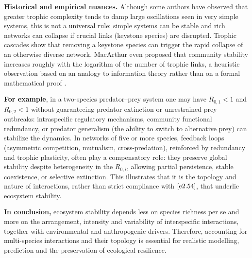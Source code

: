 \documentclass[10pt, a4paper]{amsart}
\theoremstyle{plain}
\theoremstyle{definition}
\theoremstyle{remark}
\numberwithin{equation}{section}
\begin{document}
{\bf Historical and empirical nuances.} Although some authors have observed that greater trophic complexity tends to damp large oscillations seen in very simple systems, this is not a universal rule: simple systems can be stable and rich networks can collapse if crucial links (keystone species) are disrupted. Trophic cascades show that removing a keystone species can trigger the rapid collapse of an otherwise diverse network. MacArthur even proposed that community stability increases roughly with the logarithm of the number of trophic links, a heuristic observation based on an analogy to information theory rather than on a formal mathematical proof \cite{ref76}. 

{\bf For example}, in a two-species predator–prey system one may have $R_{0,1}<1$ and $R_{0,2}<1$ without guaranteeing predator extinction or unrestrained prey outbreaks: intraspecific regulatory mechanisms, community functional redundancy, or predator generalism (the ability to switch to alternative prey) can stabilize the dynamics. In networks of five or more species, feedback loops (asymmetric competition, mutualism, cross-predation), reinforced by redundancy and trophic plasticity, often play a compensatory role: they preserve global stability despite heterogeneity in the $R_{0,i}$, allowing partial persistence, stable coexistence, or selective extinction. This illustrates that it is the topology and nature of interactions, rather than strict compliance with $\eqref{e2.54}$, that underlie ecosystem stability.

{\bf In conclusion,} ecosystem stability depends less on species richness per se and more on the arrangement, intensity and variability of interspecific interactions, together with environmental and anthropogenic drivers. Therefore, accounting for multi-species interactions and their topology is essential for realistic modelling, prediction and the preservation of ecological resilience.


\end{document}
